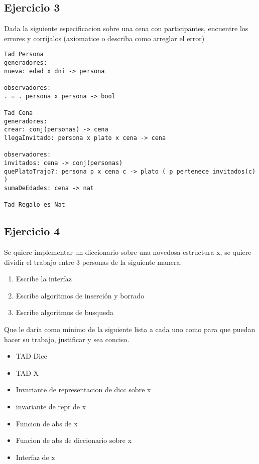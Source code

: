 \documentclass[10pt, a4paper]{article}
\begin{document}
\subsection*{Ejercicio 3}

Dada la siguiente especificacion sobre una cena con participantes, encuentre los errores y corr\'ijalos (axiomatice o describa como arreglar el error)

\begin{verbatim}
Tad Persona
generadores:
nueva: edad x dni -> persona

observadores:
. = . persona x persona -> bool

Tad Cena
generadores:
crear: conj(personas) -> cena
llegaInvitado: persona x plato x cena -> cena

observadores:
invitados: cena -> conj(personas)
quePlatoTrajo?: persona p x cena c -> plato ( p pertenece invitados(c) )
sumaDeEdades: cena -> nat

Tad Regalo es Nat
\end{verbatim}


\subsection*{Ejercicio 4}

Se quiere implementar un diccionario sobre una novedosa estructura x, se quiere dividir el trabajo entre 3 personas de la siguiente manera:
\begin{enumerate}
 \item Escribe la interfaz
 \item Escribe algoritmos de inserci\'on y borrado 
 \item Escribe algoritmos de busqueda
\end{enumerate}

Que le daria como minimo de la siguiente lista a cada uno como para que puedan hacer su trabajo, justificar y sea conciso.

\begin{itemize}
 \item TAD Dicc
 \item TAD X
 \item Invariante de representacion de dicc sobre x
 \item invariante de repr de x
 \item Funcion de abs de x
 \item Funcion de abs de diccionario sobre x
 \item Interfaz de x
\end{itemize}
\end{document}
